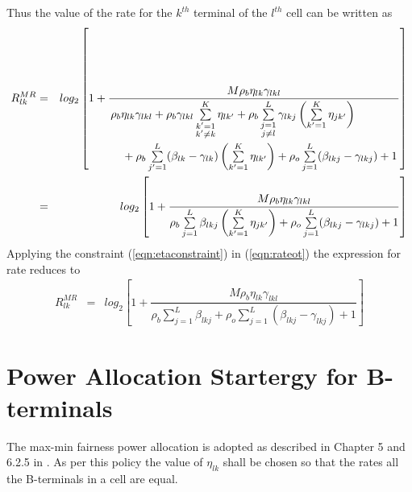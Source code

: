 \documentclass[10pt, a4paper, twoside,fleqn]{article}
\begin{document}
Thus the value of the rate for the $k^{th}$ terminal of the $l^{th}$ cell can be written as
\begin{eqnarray}\label{eqn:rateot}
R_{lk}^{MR} &=& log_2\left[1+ \dfrac{M\rho_b\eta_{lk}\gamma_{lkl}}
{\splitdfrac{\rho_b\eta_{lk}\gamma_{lkl}
    +\rho_b\gamma_{lkl}\sum\limits_{\substack{k'=1\\ k'\neq k}}^{K}\eta_{lk'}
    +\rho_b\sum\limits_{\substack{j=1 \\ j \neq l}}^{L}\gamma_{lkj}\left(\sum\limits_{k'=1}^{K}\eta_{jk'}\right)}
    {+\rho_b\sum\limits_{j'=1}^{L}(\beta_{lk}-\gamma_{lk})\left(\sum\limits_{k'=1}^{K}\eta_{lk'}\right)
    +\rho_o\sum\limits_{j=1}^{L}(\beta_{lkj} -\gamma_{lkj})
    +1}}\right] \nonumber \\
        &=& log_2\left[1+\dfrac{M\rho_b\eta_{lk}\gamma_{lkl}}{\rho_b\sum\limits_{j=1}^{L}\beta_{lkj}\left(\sum\limits_{k'=1}^{K}\eta_{jk'}\right)+\rho_o\sum\limits_{j=1}^{L}(\beta_{lkj} -\gamma_{lkj})+1}\right]
\end{eqnarray}
Applying the constraint (\ref{eqn:etaconstraint}) in (\ref{eqn:rateot}) the expression for rate reduces to
\begin{eqnarray}\label{eqn:finalratebt}
R_{lk}^{MR} &=& log_2\left[1+\dfrac{M\rho_b\eta_{lk}\gamma_{lkl}}{\rho_b\sum\limits_{j=1}^{L}\beta_{lkj}+\rho_o\sum\limits_{j=1}^{L}(\beta_{lkj} -\gamma_{lkj})+1}\right]
\end{eqnarray}


\section{Power Allocation Startergy for B-terminals}
The max-min fairness power allocation is adopted as described in Chapter 5 and 6.2.5 in \cite{bib:MassiveMimoBook}. As per this policy the value of $\eta_{lk}$ shall be chosen so that the rates all the B-terminals in a cell are equal. 
\end{document}
